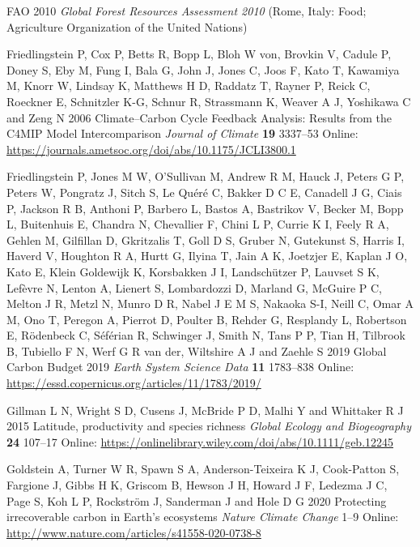 \documentclass[
]{article}
\newlength{\cslhangindent}
\newenvironment{cslreferences}%
  {\setlength{\parindent}{0pt}%
  \everypar{\setlength{\hangindent}{\cslhangindent}}\ignorespaces}%
  {\par}
\begin{document}
\begin{cslreferences}
\leavevmode\hypertarget{ref-fao_global_2010}{}%
FAO 2010 \emph{Global Forest Resources Assessment 2010} (Rome, Italy:
Food; Agriculture Organization of the United Nations)

\leavevmode\hypertarget{ref-friedlingstein_climatecarbon_2006}{}%
Friedlingstein P, Cox P, Betts R, Bopp L, Bloh W von, Brovkin V, Cadule
P, Doney S, Eby M, Fung I, Bala G, John J, Jones C, Joos F, Kato T,
Kawamiya M, Knorr W, Lindsay K, Matthews H D, Raddatz T, Rayner P, Reick
C, Roeckner E, Schnitzler K-G, Schnur R, Strassmann K, Weaver A J,
Yoshikawa C and Zeng N 2006 Climate--Carbon Cycle Feedback Analysis:
Results from the C4MIP Model Intercomparison \emph{Journal of Climate}
\textbf{19} 3337--53 Online:
\url{https://journals.ametsoc.org/doi/abs/10.1175/JCLI3800.1}

\leavevmode\hypertarget{ref-friedlingstein_global_2019}{}%
Friedlingstein P, Jones M W, O'Sullivan M, Andrew R M, Hauck J, Peters G
P, Peters W, Pongratz J, Sitch S, Le Quéré C, Bakker D C E, Canadell J
G, Ciais P, Jackson R B, Anthoni P, Barbero L, Bastos A, Bastrikov V,
Becker M, Bopp L, Buitenhuis E, Chandra N, Chevallier F, Chini L P,
Currie K I, Feely R A, Gehlen M, Gilfillan D, Gkritzalis T, Goll D S,
Gruber N, Gutekunst S, Harris I, Haverd V, Houghton R A, Hurtt G, Ilyina
T, Jain A K, Joetzjer E, Kaplan J O, Kato E, Klein Goldewijk K,
Korsbakken J I, Landschützer P, Lauvset S K, Lefèvre N, Lenton A,
Lienert S, Lombardozzi D, Marland G, McGuire P C, Melton J R, Metzl N,
Munro D R, Nabel J E M S, Nakaoka S-I, Neill C, Omar A M, Ono T, Peregon
A, Pierrot D, Poulter B, Rehder G, Resplandy L, Robertson E, Rödenbeck
C, Séférian R, Schwinger J, Smith N, Tans P P, Tian H, Tilbrook B,
Tubiello F N, Werf G R van der, Wiltshire A J and Zaehle S 2019 Global
Carbon Budget 2019 \emph{Earth System Science Data} \textbf{11}
1783--838 Online:
\url{https://essd.copernicus.org/articles/11/1783/2019/}

\leavevmode\hypertarget{ref-gillman_latitude_2015}{}%
Gillman L N, Wright S D, Cusens J, McBride P D, Malhi Y and Whittaker R
J 2015 Latitude, productivity and species richness \emph{Global Ecology
and Biogeography} \textbf{24} 107--17 Online:
\url{https://onlinelibrary.wiley.com/doi/abs/10.1111/geb.12245}

\leavevmode\hypertarget{ref-goldstein_protecting_2020}{}%
Goldstein A, Turner W R, Spawn S A, Anderson-Teixeira K J, Cook-Patton
S, Fargione J, Gibbs H K, Griscom B, Hewson J H, Howard J F, Ledezma J
C, Page S, Koh L P, Rockström J, Sanderman J and Hole D G 2020
Protecting irrecoverable carbon in Earth's ecosystems \emph{Nature
Climate Change} 1--9 Online:
\url{http://www.nature.com/articles/s41558-020-0738-8}


\end{cslreferences}
\end{document}
